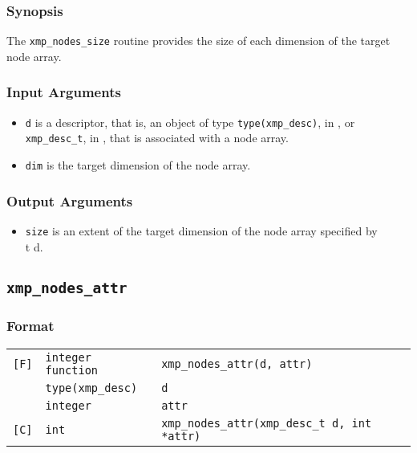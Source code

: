 \subsubsection*{Synopsis}

The {\tt xmp\_nodes\_size} routine provides the size of each dimension
of the target node array.

\subsubsection*{Input Arguments}

\begin{itemize}
 \item {\tt d} is a descriptor, that is, an object of type 
       {\tt type(xmp\_desc)}, in {\XMPF}, or {\tt xmp\_desc\_t},
       in {\XMPC}, that is associated with a node array.
 \item {\tt dim} is the target dimension of the node array.
\end{itemize}

\subsubsection*{Output Arguments}

\begin{itemize}
 \item {\tt size} is an extent of the target dimension of the node array
       specified by {\\t d}.
\end{itemize}


\subsection{\tt xmp\_nodes\_attr}

\subsubsection*{Format}

\begin{tabular}{lll}

\verb![F]!& {\tt integer function}& {\tt xmp\_nodes\_attr(d, attr)}\\
          & {\tt type(xmp\_desc)} & {\tt d}\\
          & {\tt integer} & {\tt attr}\\

\verb![C]!&  {\tt int}& {\tt xmp\_nodes\_attr(xmp\_desc\_t d, int *attr)}\\

\end{tabular}

